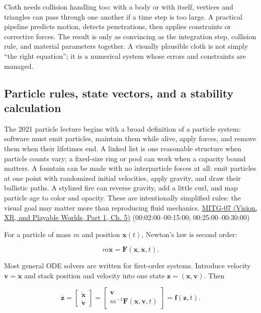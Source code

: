 Cloth needs collision handling too: with a body or with itself, vertices and triangles can pass through one another if a time step is too large. A practical pipeline predicts motion, detects penetrations, then applies constraints or corrective forces. The result is only as convincing as the integration step, collision rule, and material parameters together. A visually plausible cloth is not simply ``the right equation''; it is a numerical system whose errors and constraints are managed.

\subsection{Particle rules, state vectors, and a stability calculation}\label{04-visual-computing-ii-ch029-particle-rules-state-vectors-and-a-stability-calculation}

\hypertarget{04-visual-computing-ii-ch029-particle-rules-state-vectors-and-a-stability-calculation}{}

The 2021 particle lecture begins with a broad definition of a particle system: software must emit particles, maintain them while alive, apply forces, and remove them when their lifetimes end. A linked list is one reasonable structure when particle counts vary; a fixed-size ring or pool can work when a capacity bound matters. A fountain can be made with no interparticle forces at all: emit particles at one point with randomized initial velocities, apply gravity, and draw their ballistic paths. A stylized fire can reverse gravity, add a little curl, and map particle age to color and opacity. These are intentionally simplified rules: the visual goal may matter more than reproducing fluid mechanics. \href{../07-Vision-XR-and-Playable-Worlds-P01/main.pdf\#nameddest=04-visual-computing-ii-ch036-mitg-07---particle-systems}{MITG-07 (Vision, XR, and Playable Worlds, Part 1, Ch. 5)} (00:02:00--00:15:00; 00:25:00--00:30:00)

For a particle of mass \(m\) and position \(\boldsymbol{x}(t)\), Newton's law is second order:

\[
m\ddot{\boldsymbol{x}}=\boldsymbol{F}(\boldsymbol{x},\dot{\boldsymbol{x}},t).
\]

Most general ODE solvers are written for first-order systems. Introduce velocity \(\boldsymbol{v}=\dot{\boldsymbol{x}}\) and stack position and velocity into one state \(\boldsymbol{z}=(\boldsymbol{x},\boldsymbol{v})\). Then

\[
\dot{\boldsymbol{z}}=
\begin{bmatrix}\dot{\boldsymbol{x}}\\\dot{\boldsymbol{v}}\end{bmatrix}
=\begin{bmatrix}\boldsymbol{v}\\m^{-1}\boldsymbol{F}(\boldsymbol{x},\boldsymbol{v},t)\end{bmatrix}
=\boldsymbol{f}(\boldsymbol{z},t).
\]

